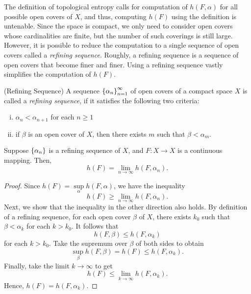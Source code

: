 \documentclass[10pt,twoside,draft]{book}
\begin{document}
The definition of topological entropy calls for computation of $h(F,\alpha)$ for all possible open covers of $X$, and thus, computing $h(F)$ using the definition is untenable.
Since the space is compact, we only need to consider open covers whose cardinalities are finite, but the number of such coverings is still large.
However, it is possible to reduce the computation to a single sequence of open covers called a \textit{refining sequence}.
Roughly, a refining sequence is a sequence of open covers that become finer and finer.
Using a refining sequence vastly simplifies the computation of $h(F)$.
\begin{definition}
  (Refining Sequence)
  A sequence $\left \{ \alpha_n \right \}^{\infty}_{n = 1}$ of open covers of a compact space $X$ is called a \textit{refining sequence}, if it satisfies the following two criteria:
  \begin{enumerate}[(i)]
    \item $\alpha_n < \alpha_{n+1}$ for each $n\geq 1$
    \item if $\beta$ is an open cover of $X$, then there exists $m$ such that $\beta < \alpha_m$.
  \end{enumerate}
\end{definition}
\begin{theorem}
  Suppose $\left \{ \alpha_n \right \}$ is a refining sequence of $X$, and $F:X\to X$ is a continuous mapping.
  Then,
  \begin{equation*}
    h(F) = \lim\limits_{n\to \infty} h(F, \alpha_n).
  \end{equation*}
  \label{thm:t-ent-ref-seq}
  \begin{proof}
    Since $h(F) = \sup\limits_{\alpha} h(F, \alpha)$, we have the inequality
    \begin{equation*}
      h(F) \geq \lim\limits_{n\to \infty} h(F, \alpha_n).
    \end{equation*}
    Next, we show that the inequality in the other direction also holds.
    By definition of a refining sequence, for each open cover $\beta$ of $X$, there exists $k_0$ such that $\beta < \alpha_k$ for each $k > k_0$.
    It follows that
    \begin{equation*}
      h(F, \beta) \leq h(F, \alpha_k)
    \end{equation*}
    for each $k > k_0$.
    Take the supremum over $\beta$ of both sides to obtain
    \begin{equation*}
      \sup\limits_{\beta} h(F, \beta) = h(F) \leq h(F, \alpha_k).
    \end{equation*}
    Finally, take the limit $k \to \infty$ to get
    \begin{equation*}
      h(F) \leq \lim\limits_{k \to \infty} h(F, \alpha_k).
    \end{equation*}
    Hence, $h(F) = h(F, \alpha_k)$.
  \end{proof}
\end{theorem}
\end{document}
